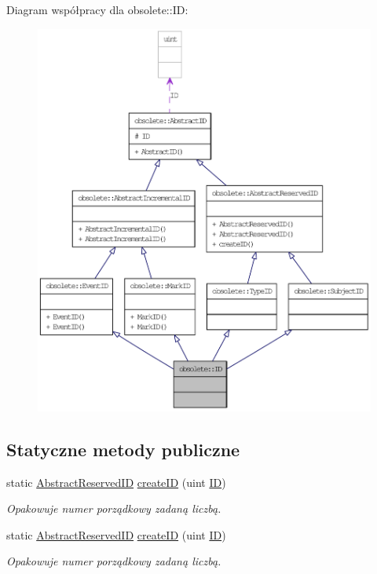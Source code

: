 Diagram współpracy dla obsolete::ID:\nopagebreak
\begin{figure}[H]
\begin{center}
\leavevmode
\includegraphics[width=400pt]{classobsolete_1_1ID__coll__graph}
\end{center}
\end{figure}
\subsection*{Statyczne metody publiczne}
\begin{DoxyCompactItemize}
\item 
static \hyperlink{classobsolete_1_1AbstractReservedID}{AbstractReservedID} \hyperlink{classobsolete_1_1AbstractReservedID_a38fa00bf6097ab9cff285c8480c8097e}{createID} (uint \hyperlink{classobsolete_1_1ID}{ID})
\begin{DoxyCompactList}\small\item\em Opakowuje numer porządkowy zadaną liczbą. \item\end{DoxyCompactList}\item 
static \hyperlink{classobsolete_1_1AbstractReservedID}{AbstractReservedID} \hyperlink{classobsolete_1_1AbstractReservedID_a38fa00bf6097ab9cff285c8480c8097e}{createID} (uint \hyperlink{classobsolete_1_1ID}{ID})
\begin{DoxyCompactList}\small\item\em Opakowuje numer porządkowy zadaną liczbą. \item\end{DoxyCompactList}\end{DoxyCompactItemize}
